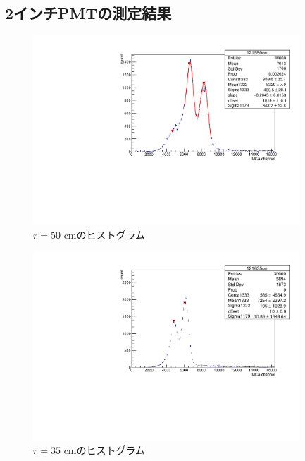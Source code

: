  
\subsection{2インチPMTの測定結果}

\begin{figure}[h]
	\centering
	\includegraphics[angle=-90,width=10cm]{fig/iguchi/121550on.pdf}
	\caption{$r=50$ cmのヒストグラム}
	\label{hist50}
\end{figure}

\begin{figure}[h]
	\centering
	\includegraphics[angle=-90,width=10cm]{fig/iguchi/121635on.pdf}
	\caption{$r=35$ cmのヒストグラム}
	\label{hist35}
\end{figure}

